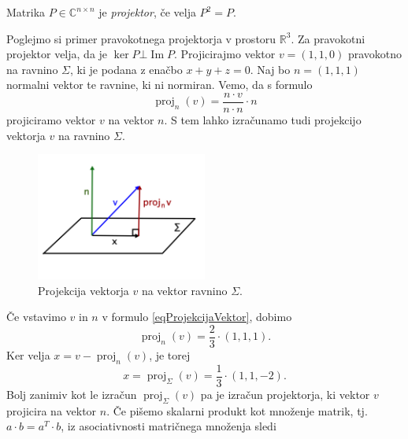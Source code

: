 \documentclass[mat1]{fmfdelo}
\newcommand{\R}{\mathbb R}
\newcommand{\C}{\mathbb C}
\DeclareMathOperator{\Ima}{Im}
\begin{document}
\begin{definicija}
    Matrika $P \in \C^{n \times n}$ je \emph{projektor}, če velja $P^2 = P$.
\end{definicija}
\begin{zgled}
    Poglejmo si primer pravokotnega projektorja v prostoru $\R^3$. Za pravokotni projektor velja, da je $\ker P \bot \Ima P$. Projicirajmo vektor $v = (1,1,0)$ pravokotno na ravnino $\Sigma$, ki je podana z enačbo $x + y + z = 0$. Naj bo $n = (1,1,1)$ normalni vektor te ravnine, ki ni normiran. Vemo, da s formulo
    \begin{equation}\label{eqProjekcijaVektor}
        \operatorname{proj}_{n}(v) = \frac{n \cdot v}{n\cdot n}\cdot n
    \end{equation}
    projiciramo vektor $v$ na vektor $n$. S tem lahko izračunamo tudi projekcijo vektorja $v$ na ravnino $\Sigma$.
    \begin{figure}[H]
        \vspace{-10pt}
        \centering
        \includegraphics[width=0.5\textwidth]{projekcija.png}
        \vspace{-25pt}
        \caption{Projekcija vektorja $v$ na vektor ravnino $\Sigma$.}
    \end{figure}
    Če vstavimo $v$ in $n$ v formulo \eqref{eqProjekcijaVektor}, dobimo
    \begin{equation*}
        \operatorname{proj}_{n}(v) = \frac{2}{3}\cdot (1,1,1).
    \end{equation*}
    Ker velja $x = v - \operatorname{proj}_{n}(v)$, je torej
    \begin{equation*}
        x = \operatorname{proj}_\Sigma (v) = \frac{1}{3}\cdot (1,1,-2).
    \end{equation*}
    Bolj zanimiv kot le izračun $\operatorname{proj}_\Sigma (v)$ pa je izračun projektorja, ki vektor $v$ projicira na vektor $n$. Če pišemo skalarni produkt kot množenje matrik, tj. $a\cdot b = a^T \cdot b$, iz asociativnosti matričnega množenja sledi
    \begin{equation*}

\end{equation*}
\end{zgled}
\end{document}
